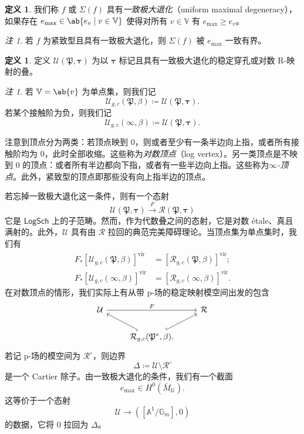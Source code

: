 \documentclass{amsart}
\theoremstyle{definition}
\newtheorem{defn}[thm]{定义}
\theoremstyle{remark}
\newtheorem{rmk}[thm]{注}
\theoremstyle{plain}
\theoremstyle{definition}
\theoremstyle{remark}
\newcommand{\A}{\mathbb{A}}
\newcommand{\G}{\mathbb{G}}
\newcommand{\V}{\mathbb{V}}
\newcommand{\mc}[1]{\mathcal{#1}}
\newcommand{\mf}[1]{\mathfrak{#1}}
\newcommand{\mr}[1]{\mathrm{#1}}
\newcommand{\ms}[1]{\mathsf{#1}}
\newcommand{\1}{\mathbf{1}}
\newcommand{\2}{\mathbf{2}}
\newcommand{\3}{\mathbf{3}}
\newcommand{\vir}{\mr{vir}}
\begin{document}
\begin{defn}
    我们称 \(f\) 或 \(\Sigma(f)\) 具有\textit{一致极大退化}（uniform maximal degeneracy），如果存在 \(e_{\max} \in \ab\{e_v \mid v \in \V \}\) 使得对所有 \(v \in \V\) 有 \(e_{\max} \geq e_v\)。
\end{defn}

\begin{rmk}
    若 \(f\) 为紧致型且具有一致极大退化，则 \(\Sigma(f)\) 被 \(e_{\max}\) 一致有界。
\end{rmk}

\begin{defn}
    定义 \(\mc{U}(\mf{P}, \bm{\tau})\) 为以 \(\bm{\tau}\) 标记且具有一致极大退化的稳定穿孔或对数 R-映射的叠。
\end{defn}

\begin{rmk}
    若 \(\V = \ab\{v\}\) 为单点集，则我们记
    \[ \mc{U}_{g, c}(\mf{P}, \beta) \coloneqq \mc{U}(\mf{P}, \bm{\tau}). \]
    若某个接触阶为负，则我们记
    \[ \mc{U}_{g, c}(\infty, \beta) \coloneqq \mc{U}(\mf{P}, \bm{\tau}). \]
\end{rmk}

注意到顶点分为两类：若顶点映到 \(0\)，则或者至少有一条半边向上指，或者所有接触阶均为 \(0\)，此时全部收缩。这些称为\textit{对数顶点}（log vertex）。另一类顶点是不映到 \(0\) 的顶点：或者所有半边都向下指，或者有一些半边向上指。这些称为\textit{\(\infty\)-顶点}。此外，紧致型的顶点即那些没有向上指半边的顶点。

若忘掉一致极大退化这一条件，则有一个态射
\[ \mc{U}(\mf{P}, \bm{\tau}) \xrightarrow{F} \mc{R}(\mf{P}, \bm{\tau}) \]
它是 \(\ms{LogSch}\) 上的子范畴。然而，作为代数叠之间的态射，它是对数 étale、真且满射的。此外，\(\mc{U}\) 具有由 \(\mc{R}\) 拉回的典范完美障碍理论。当顶点集为单点集时，我们有
\begin{align*}
    F_* [\mc{U}_{g, c}(\mf{P}, \beta)]^{\vir} &= [\mc{R}_{g, c}(\mf{P}, \beta)]^{\vir}; \\
    F_* [\mc{U}_{g, c}(\infty, \beta)]^{\vir} &= [\mc{R}_{g, c}(\infty, \beta)]^{\vir}.
\end{align*}
在对数顶点的情形，我们实际上有从带 p-场的稳定映射模空间出发的包含
\begin{equation*}
\begin{tikzcd}
    \mc{U} \ar{rr}{F} & & \mc{R} \\
    & \mc{R}_{g,c}(\mf{P}^{\circ}, \beta) \ar[hookrightarrow]{ul} \ar[hookrightarrow]{ur}.
\end{tikzcd}
\end{equation*}
若记 p-场的模空间为 \(\mc{R}^{\circ}\)，则边界
\[ \Delta \coloneqq \mc{U} \setminus \mc{R}^{\circ} \]
是一个 Cartier 除子。由一致极大退化的条件，我们有一个截面
\[ e_{\max} \in H^0(\bar{M}_{\mc{U}}). \]
这等价于一个态射
\[ \mc{U} \to ([\A^1/\G_m], 0) \]
的数据，它将 \(0\) 拉回为 \(\Delta\)。
\end{document}
